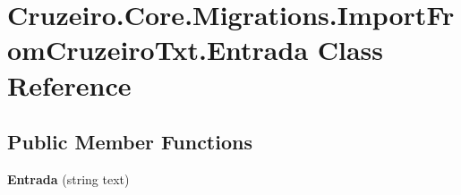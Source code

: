 \hypertarget{class_cruzeiro_1_1_core_1_1_migrations_1_1_import_from_cruzeiro_txt_1_1_entrada}{}\section{Cruzeiro.\+Core.\+Migrations.\+Import\+From\+Cruzeiro\+Txt.\+Entrada Class Reference}
\label{class_cruzeiro_1_1_core_1_1_migrations_1_1_import_from_cruzeiro_txt_1_1_entrada}
\subsection*{Public Member Functions}
\begin{DoxyCompactItemize}
\item 
{\bfseries Entrada} (string text)\hypertarget{class_cruzeiro_1_1_core_1_1_migrations_1_1_import_from_cruzeiro_txt_1_1_entrada_acc21e53c521ae544cc00e5a014518f2f}{}\label{class_cruzeiro_1_1_core_1_1_migrations_1_1_import_from_cruzeiro_txt_1_1_entrada_acc21e53c521ae544cc00e5a014518f2f}

\end{DoxyCompactItemize}
